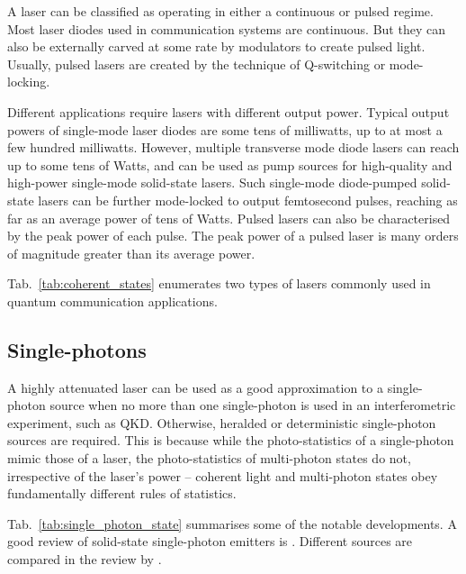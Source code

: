 A laser can be classified as operating in either a continuous or pulsed regime. Most laser diodes used in communication systems are continuous. But they can also be externally carved at some rate by modulators to create pulsed light. Usually, pulsed lasers are created by the technique of Q-switching or mode-locking.

Different applications require lasers with different output power. Typical output powers of single-mode laser diodes are some tens of milliwatts, up to at most a few hundred milliwatts. However, multiple transverse mode diode lasers can reach up to some tens of Watts, and can be used as pump sources for high-quality and high-power single-mode solid-state lasers. Such single-mode diode-pumped solid-state lasers can be further mode-locked to output femtosecond pulses, reaching as far as an average power of tens of Watts. Pulsed lasers can also be characterised by the peak power of each pulse. The peak power of a pulsed laser is many orders of magnitude greater than its average power.

Tab.~\ref{tab:coherent_states} enumerates two types of lasers commonly used in quantum communication applications.

%
%

\subsection{Single-photons} 

A highly attenuated laser can be used as a good approximation to a single-photon source when no more than one single-photon is used in an interferometric experiment, such as QKD. Otherwise, heralded or deterministic single-photon sources are required. This is because while the photo-statistics of a single-photon mimic those of a laser, the photo-statistics of multi-photon states do not, irrespective of the laser's power -- coherent light and multi-photon states obey fundamentally different rules of statistics.

Tab.~\ref{tab:single_photon_state} summarises some of the notable developments. A good review of solid-state single-photon emitters is \cite{bib:aharonovich2016solid}. Different sources are compared in the review by \cite{bib:eisaman2011}.

%
%

